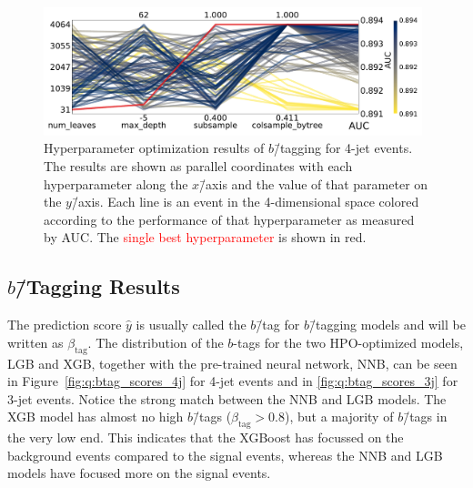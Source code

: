 \begin{figure}
  \includegraphics[width=0.98\textwidth, trim=0 0 0 0, clip]{figures/quarks/CV_viz-njet=4-name=lf_lgb_down_sample=1.00-ML_vars=vertex-selection=b-ejet_min=4-n_iter_RS_lgb=99-n_iter_RS_xgb=9-cdot_cut=0.90-version=19.pdf}
  \caption[Parallel Plot of HPO Results for 4-Jet $b$\=/Tagging]
          {Hyperparameter optimization results of $b$\=/tagging for 4-jet events. The results are shown as parallel coordinates with each hyperparameter along the $x$\=/axis and the value of that parameter on the $y$\=/axis. Each line is an event in the 4-dimensional space colored according to the performance of that hyperparameter as measured by AUC. The \textcolor{red}{single best hyperparameter} is shown in red. 
          } 
  \label{fig:q:initial_CV_res_parallel_coords_4j}
\end{figure}

\subsection{$b$\=/Tagging Results}

The prediction score $\hat{y}$ is usually called the $b$\=/tag for $b$\=/tagging models and will be written as $\beta_\mathrm{tag}$. The distribution of the $b$-tags for the two HPO-optimized models, LGB and XGB, together with the pre-trained neural network, NNB, can be seen in Figure~\ref{fig:q:btag_scores_4j} for 4-jet events and in \ref{fig:q:btag_scores_3j} for 3-jet events. Notice the strong match between the NNB and LGB models. The XGB model has almost no high $b$\=/tags ($\beta_\mathrm{tag} > 0.8$), but a majority of $b$\=/tags in the very low end. This indicates that the XGBoost has focussed on the background events compared to the signal events, whereas the NNB and LGB models have focused more on the signal events. 

